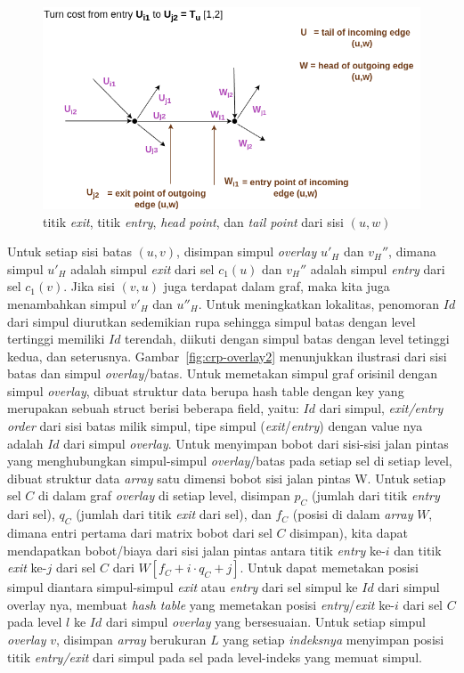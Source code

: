 \begin{figure}[H]
    \centering
    \includegraphics[scale=0.5]{figures/turn_cost_exit_entry.png}
    \caption{titik \textit{exit}, titik \textit{entry}, \textit{head point}, dan \textit{tail point} dari sisi $(u,w)$}
    \label{fig:crp-exit-entry-point}
\end{figure}


Untuk setiap sisi batas $(u,v)$, disimpan simpul \textit{overlay} $u'_{H}$ dan $v_{H}''$, dimana simpul $u'_{H}$ adalah simpul \textit{exit} dari sel $c_1(u)$ dan $v_{H}''$ adalah simpul \textit{entry} dari sel $c_1(v)$. Jika sisi $(v,u)$ juga terdapat dalam graf, maka kita juga menambahkan simpul $v'_H$ dan $u''_{H}$. Untuk meningkatkan lokalitas, penomoran $Id$ dari simpul diurutkan sedemikian rupa sehingga simpul batas dengan level tertinggi memiliki $Id$ terendah, diikuti dengan simpul batas dengan level tetinggi kedua, dan seterusnya. Gambar~\ref{fig:crp-overlay2} menunjukkan ilustrasi dari sisi batas dan simpul \textit{overlay}/batas. Untuk memetakan simpul graf orisinil dengan simpul \textit{overlay}, dibuat struktur data berupa hash table dengan key yang merupakan sebuah struct berisi beberapa field, yaitu: $Id$ dari simpul, \textit{exit/entry order} dari sisi batas milik simpul, tipe simpul (\textit{exit}/\textit{entry}) dengan value nya adalah $Id$ dari simpul \textit{overlay}. Untuk menyimpan bobot dari sisi-sisi jalan pintas yang menghubungkan simpul-simpul \textit{overlay}/batas pada setiap sel di setiap level, dibuat struktur data \textit{array} satu dimensi bobot sisi jalan pintas W. Untuk setiap sel $C$ di dalam graf \textit{overlay} di setiap level, disimpan $p_C$ (jumlah dari titik \textit{entry} dari sel), $q_C$ (jumlah dari titik \textit{exit} dari sel), dan $f_C$ (posisi di dalam \textit{array} $W$, dimana entri pertama dari matrix bobot dari sel $C$ disimpan), kita dapat mendapatkan bobot/biaya dari sisi jalan pintas antara titik \textit{entry} ke-$i$ dan titik \textit{exit} ke-$j$ dari sel $C$ dari $W[f_C+i\cdot q_C + j]$. Untuk dapat memetakan posisi simpul diantara simpul-simpul \textit{exit} atau \textit{entry} dari sel simpul ke $Id$ dari simpul overlay nya, 
membuat \textit{hash table} yang memetakan posisi \textit{entry}/\textit{exit} ke-$i$ dari sel $C$ pada level $l$ ke $Id$ dari simpul \textit{overlay} yang bersesuaian. Untuk setiap simpul \textit{overlay} $v$, disimpan \textit{array} berukuran $L$ yang setiap \textit{indeksnya} menyimpan posisi titik \textit{entry/exit} dari simpul pada sel pada level-indeks yang memuat simpul.


